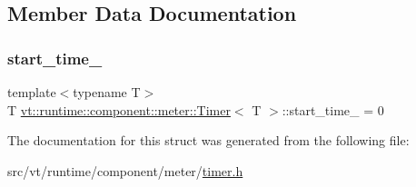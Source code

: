 \subsection{Member Data Documentation}
\mbox{\label{structvt_1_1runtime_1_1component_1_1meter_1_1_timer_a097137934875f01d9e9ed8653916df64}} 
\subsubsection{\texorpdfstring{start\+\_\+time\+\_\+}{start\_time\_}}
{\footnotesize\ttfamily template$<$typename T$>$ \\
T \hyperlink{structvt_1_1runtime_1_1component_1_1meter_1_1_timer}{vt\+::runtime\+::component\+::meter\+::\+Timer}$<$ T $>$\+::start\+\_\+time\+\_\+ = 0\hspace{0.3cm}{\ttfamily [private]}}



The documentation for this struct was generated from the following file\+:\begin{DoxyCompactItemize}
\item 
src/vt/runtime/component/meter/\hyperlink{timer_8h}{timer.\+h}\end{DoxyCompactItemize}
